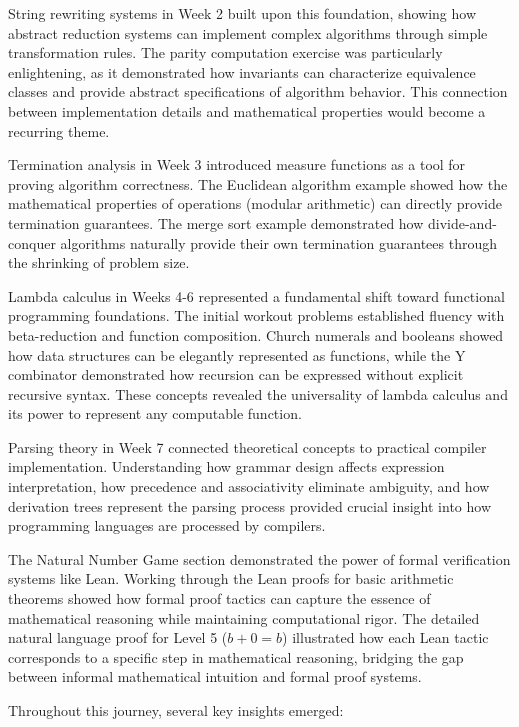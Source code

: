 \documentclass{article}
\theoremstyle{plain}
\theoremstyle{definition}
\theoremstyle{remark}
\begin{document}
String rewriting systems in Week 2 built upon this foundation, showing how abstract reduction systems can implement complex algorithms through simple transformation rules. The parity computation exercise was particularly enlightening, as it demonstrated how invariants can characterize equivalence classes and provide abstract specifications of algorithm behavior. This connection between implementation details and mathematical properties would become a recurring theme.

Termination analysis in Week 3 introduced measure functions as a tool for proving algorithm correctness. The Euclidean algorithm example showed how the mathematical properties of operations (modular arithmetic) can directly provide termination guarantees. The merge sort example demonstrated how divide-and-conquer algorithms naturally provide their own termination guarantees through the shrinking of problem size.

Lambda calculus in Weeks 4-6 represented a fundamental shift toward functional programming foundations. The initial workout problems established fluency with beta-reduction and function composition. Church numerals and booleans showed how data structures can be elegantly represented as functions, while the Y combinator demonstrated how recursion can be expressed without explicit recursive syntax. These concepts revealed the universality of lambda calculus and its power to represent any computable function.

Parsing theory in Week 7 connected theoretical concepts to practical compiler implementation. Understanding how grammar design affects expression interpretation, how precedence and associativity eliminate ambiguity, and how derivation trees represent the parsing process provided crucial insight into how programming languages are processed by compilers.

The Natural Number Game section demonstrated the power of formal verification systems like Lean. Working through the Lean proofs for basic arithmetic theorems showed how formal proof tactics can capture the essence of mathematical reasoning while maintaining computational rigor. The detailed natural language proof for Level 5 ($b + 0 = b$) illustrated how each Lean tactic corresponds to a specific step in mathematical reasoning, bridging the gap between informal mathematical intuition and formal proof systems.

Throughout this journey, several key insights emerged:
\end{document}
